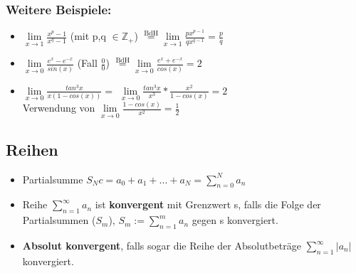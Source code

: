 \documentclass[6pt]{article}
\begin{document}
\begin{multicols*}{3}
\begin{doublespace}
\begin{tabular}{lll}
		\end{tabular}
	\end{doublespace}
	\vspace{-5mm}

	\subsubsection*{Weitere Beispiele:}  
	\vspace{-5mm} 
	\begin{itemize}[itemsep=2pt, parsep=3pt, leftmargin=*,align=left]
		\item $\lim\limits_{x \to 1}  \frac{x^p-1}{x^q-1}$ (mit p,q $\in \mathbb{Z}_+$) \quad $\overset{\text{BdH}}= \lim\limits_{x \to 1}  \frac{px^{p-1}}{qx^{q-1}} = \frac{p}{q}$	
		\item $\lim\limits_{x \to 0} \frac{e^x - e^{-x}}{sin(x)}$ (Fall $\frac{0}{0}$)  \quad  $\overset{\text{BdH}}= \lim\limits_{x \to 0} \frac{e^x + e^{-x}}{cos(x)} = 2$ 
		\item $\lim\limits_{x \to 0} \frac{tan^3 x}{x(1-cos(x))} = $ $\lim\limits_{x \to 0} \frac{tan^3 x}{x^3} * \frac{x^2}{1-cos(x)} = 2$ \\
			Verwendung von $\lim\limits_{x \to 0} \frac{1-cos(x)}{x^2} = \frac{1}{2}$
	\end{itemize}


	\vspace{10mm}
	
\pagebreak
	
\subsection*{Reihen}

\begin{itemize}[itemsep=2pt, parsep=3pt, leftmargin=*,align=left]
	\item Partialsumme $S_Nc = a_0 + a_1 + ... + a_N = \sum_{n=0}^N a_n$ 
	\item Reihe $\sum_{n=1}^\infty a_n$ ist {\bf konvergent} mit Grenzwert s, falls die Folge der Partialsummen ($S_m$), $S_m := \sum_{n=1}^m a_n$ gegen s konvergiert.
	\item {\bf Absolut konvergent}, falls sogar die Reihe der Absolutbetr{\"a}ge $\sum_{n=1}^\infty |a_n|$ konvergiert.
\end{itemize}

 \par 
\vspace{5mm}


\end{multicols*}
\end{document}

